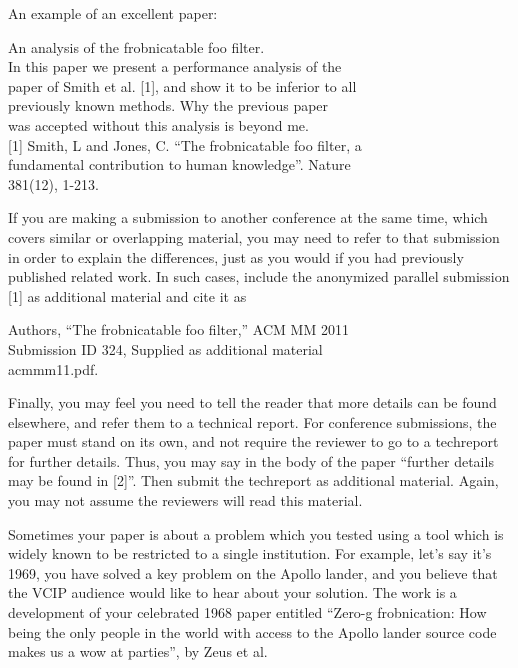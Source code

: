 \documentclass[10pt,conference,a4paper]{IEEEtran}
\begin{document}
An example of an excellent paper:
\begin{flushleft}
\setlength{\leftskip}{.15in}
\hspace{.5in} An analysis of the frobnicatable foo filter.\\
In this paper we present a performance analysis of the \\
paper of Smith et al. [1], and show it to be inferior to all \\
previously known methods. Why the previous paper \\
was accepted without this analysis is beyond me. \\

[1] Smith, L and Jones, C. ``The frobnicatable foo filter, a \\
fundamental contribution to human knowledge''. Nature \\
381(12), 1-213.\\
\setlength{\leftskip}{0in}
\end{flushleft}

If you are making a submission to another conference at the same time, which covers 
similar or overlapping material, you may need to refer to that submission in order to 
explain the differences, just as you would if you had previously published related work.
 In such cases, include the anonymized parallel submission [1] as additional material and 
cite it as

\begin{flushleft}
\setlength{\leftskip}{.15in}
Authors, ``The frobnicatable foo filter,'' ACM MM 2011 \\
Submission ID 324, Supplied as additional material \\
acmmm11.pdf.\\
\setlength{\leftskip}{0in}
\end{flushleft}

Finally, you may feel you need to tell the reader that more details can be found elsewhere, 
and refer them to a technical report. For conference submissions, the paper must stand on 
its own, and not require the reviewer to go to a techreport for further details. Thus, you 
may say in the body of the paper ``further details may be found in [2]''. Then submit the
techreport as additional material. Again, you may not assume the reviewers will read this material.

Sometimes your paper is about a problem which you tested using a tool which is widely known 
to be restricted to a single institution. For example, let’s say it’s 1969, you have solved a key 
problem on the Apollo lander, and you believe that the VCIP audience would like to hear about 
your solution. The work is a development of your celebrated 1968 paper entitled ``Zero-g frobnication: 
How being the only people in the world with access to the Apollo lander source code makes us a wow 
at parties'', by Zeus et al.
\end{document}

